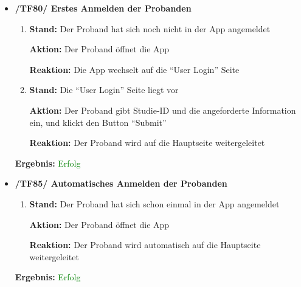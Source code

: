 \documentclass[a4paper]{scrreprt}
\begin{document}
            \begin{itemize}

            \item \textbf{/TF80/ Erstes Anmelden der Probanden}
            \begin{enumerate}
                \item \par \textbf{Stand: }Der Proband hat sich noch nicht in der App angemeldet
                \par \textbf{Aktion: }Der Proband öffnet die App
                \par \textbf{Reaktion: }Die App wechselt auf die ``User Login'' Seite
                \item \par \textbf{Stand: }Die ``User Login'' Seite liegt vor
                \par \textbf{Aktion: }Der Proband gibt Studie-ID und die angeforderte Information ein, und klickt den Button ``Submit''
                \par \textbf{Reaktion: }Der Proband wird auf die Hauptseite weitergeleitet
            \end{enumerate}
					\vspace*{0.3cm}
		           \par \textbf{Ergebnis: }\textcolor{green}{Erfolg}
		           \vspace*{0.6cm}          

	        \item \textbf{/TF85/ Automatisches Anmelden der Probanden}
	        \begin{enumerate}
	        	\item \par \textbf{Stand: }Der Proband hat sich schon einmal in der App angemeldet
	        	\par \textbf{Aktion: }Der Proband öffnet die App
	        	\par \textbf{Reaktion: }Der Proband wird automatisch auf die Hauptseite weitergeleitet
	        \end{enumerate}
					\vspace*{0.3cm}
		           \par \textbf{Ergebnis: }\textcolor{green}{Erfolg}
		           \vspace*{0.6cm} 	        


\end{itemize}
\end{document}
